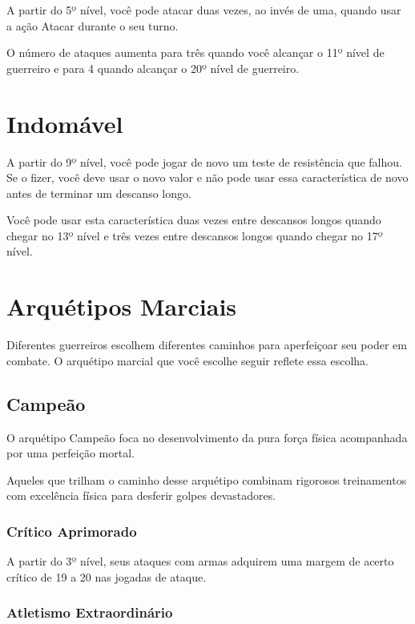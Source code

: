 \documentclass{RPG_Adventure}[2021/10/20]
\begin{document}
\begin{multicols}{2}
A partir do 5º nível, você pode atacar duas vezes, ao invés de uma, quando usar
a ação Atacar durante o seu turno.

O número de ataques aumenta para três quando você alcançar o 11º nível de
guerreiro e para 4 quando alcançar o 20º nível de guerreiro.

\section*{Indomável}%

A partir do 9º nível, você pode jogar de novo um teste de resistência que
falhou. Se o fizer, você deve usar o novo valor e não pode usar essa
característica de novo antes de terminar um descanso longo.

Você pode usar esta característica duas vezes entre descansos longos quando
chegar no 13º nível e três vezes entre descansos longos quando chegar no 17º
nível.

\section*{Arquétipos Marciais}%

Diferentes guerreiros escolhem diferentes caminhos para aperfeiçoar seu poder em
combate. O arquétipo marcial que você escolhe seguir reflete essa escolha.

\subsection*{Campeão}%

O arquétipo Campeão foca no desenvolvimento da pura força física acompanhada por
uma perfeição mortal.

Aqueles que trilham o caminho desse arquétipo combinam rigorosos treinamentos
com excelência física para desferir golpes devastadores.

\subsubsection{Crítico Aprimorado}%

A partir do 3º nível, seus ataques com armas adquirem uma margem de acerto
crítico de 19 a 20 nas jogadas de ataque.

\subsubsection{Atletismo Extraordinário}%


\end{multicols}
\end{document}
